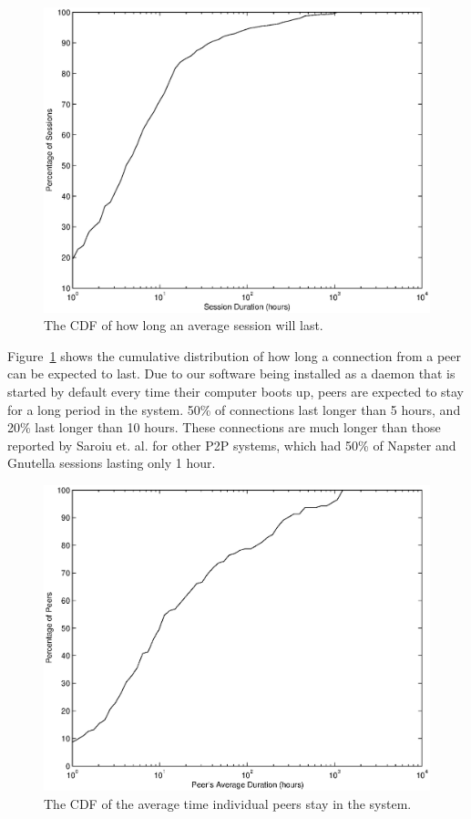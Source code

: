 \documentclass[conference]{IEEEtran}
\begin{document}
\begin{figure}
\centering
\includegraphics[width=\columnwidth]{AptP2PDuration-peers.eps}
\caption{The CDF of how long an average session will last.}
\label{duration_peers}
\end{figure}

Figure~\ref{duration_peers} shows the cumulative distribution of how
long a connection from a peer can be expected to last. Due to our
software being installed as a daemon that is started by default
every time their computer boots up, peers are expected to stay for a
long period in the system. 50\% of connections last longer than 5
hours, and 20\% last longer than 10 hours. These connections are
much longer than those reported by Saroiu et. al. \cite{saroiu2001}
for other P2P systems, which had 50\% of Napster and Gnutella
sessions lasting only 1 hour.

\begin{figure}
\centering
\includegraphics[width=\columnwidth]{AptP2PDuration-ind_peers.eps}
\caption{The CDF of the average time individual peers stay in the
system.}
\label{duration_ind_peers}
\end{figure}
\end{document}
